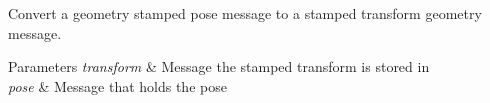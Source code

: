 Convert a geometry stamped pose message to a stamped transform geometry message. 


\begin{DoxyParams}{Parameters}
{\em transform} & Message the stamped transform is stored in \\
\hline
{\em pose} & Message that holds the pose \\
\hline
\end{DoxyParams}
